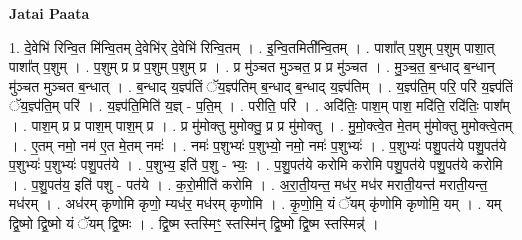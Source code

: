 \documentclass[17pt]{extarticle}
\begin{document}
\textbf{Jatai Paata} \newline

1. दे॒वेभि॑ रिन्वि॒त मि॑न्वि॒तम् दे॒वेभि॑र् दे॒वेभि॑ रिन्वि॒तम् । . इ॒न्वि॒तमिती᳚न्वि॒तम् । . पाशा᳚त् प॒शुम् प॒शुम् पाशा॒त् पाशा᳚त् प॒शुम् । . प॒शुम् प्र प्र प॒शुम् प॒शुम् प्र । . प्र मु॑ञ्चत मुञ्चत॒ प्र प्र मु॑ञ्चत । . मु॒ञ्च॒त॒ ब॒न्धाद् ब॒न्धान् मु॑ञ्चत मुञ्चत ब॒न्धात् । . ब॒न्धाद् य॒ज्ञ्प॑तिं ॅय॒ज्ञ्प॑तिम् ब॒न्धाद् ब॒न्धाद् य॒ज्ञ्प॑तिम् । . य॒ज्ञ्प॑ति॒म् परि॒ परि॑ य॒ज्ञ्प॑तिं ॅय॒ज्ञ्प॑ति॒म् परि॑ । . य॒ज्ञ्प॑ति॒मिति॑ य॒ज्ञ् - प॒ति॒म् । . परीति॒ परि॑ । . अदि॑तिः॒ पाश॒म् पाश॒ मदि॑ति॒ रदि॑तिः॒ पाश᳚म् । . पाश॒म् प्र प्र पाश॒म् पाश॒म् प्र । . प्र मु॑मोक्तु मुमोक्तु॒ प्र प्र मु॑मोक्तु । . मु॒मो॒क्त्वे॒त मे॒तम् मु॑मोक्तु मुमोक्त्वे॒तम् । . ए॒तम् नमो॒ नम॑ ए॒त मे॒तम् नमः॑ । . नमः॑ प॒शुभ्यः॑ प॒शुभ्यो॒ नमो॒ नमः॑ प॒शुभ्यः॑ । . प॒शुभ्यः॑ पशु॒पत॑ये पशु॒पत॑ये प॒शुभ्यः॑ प॒शुभ्यः॑ पशु॒पत॑ये । . प॒शुभ्य॒ इति॑ प॒शु - भ्यः॒ । . प॒शु॒पत॑ये करोमि करोमि पशु॒पत॑ये पशु॒पत॑ये करोमि । . प॒शु॒पत॑य॒ इति॑ पशु - पत॑ये । . क॒रो॒मीति॑ करोमि । . अ॒रा॒ती॒यन्त॒ मध॑र॒ मध॑र मराती॒यन्त॑ मराती॒यन्त॒ मध॑रम् । . अध॑रम् कृणोमि कृणो॒ म्यध॑र॒ मध॑रम् कृणोमि । . कृ॒णो॒मि॒ यं ॅयम् कृ॑णोमि कृणोमि॒ यम् । . यम् द्वि॒ष्मो द्वि॒ष्मो यं ॅयम् द्वि॒ष्मः । . द्वि॒ष्म स्तस्मिꣳ॒॒ स्तस्मि॑न् द्वि॒ष्मो द्वि॒ष्म स्तस्मिन्न्॑ । \newline
\end{document}
